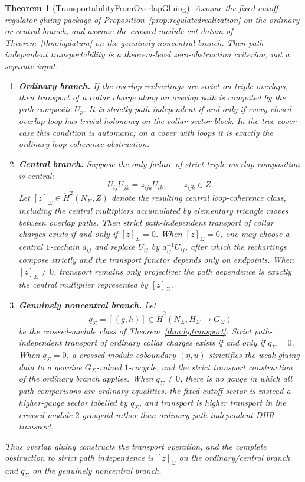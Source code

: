 \documentclass[11pt]{article}
\newtheorem{theorem}{Theorem}[section]
\begin{document}
\begin{theorem}[TransportabilityFromOverlapGluing]\label{thm:transport-from-gluing}
Assume the fixed-cutoff regulator gluing package of Proposition~\ref{prop:regulatedrealization}
on the ordinary or central branch, and assume the crossed-module cut datum of
Theorem~\ref{thm:hgdatum} on the genuinely noncentral branch. Then path-independent
transportability is a theorem-level zero-obstruction criterion, not a separate input.
\begin{enumerate}[label=\textup{(\roman*)},leftmargin=2em]
\item \textbf{Ordinary branch.} If the overlap rechartings are strict on triple overlaps, then
transport of a collar charge along an overlap path is computed by the path composite \(U_p\).
It is strictly path-independent if and only if every closed overlap loop has trivial holonomy on
the collar-sector block. In the tree-cover case this condition is automatic; on a cover with
loops it is exactly the ordinary loop-coherence obstruction.
\item \textbf{Central branch.} Suppose the only failure of strict triple-overlap composition is
central:
\[
U_{ij}U_{jk}=z_{ijk}U_{ik},\qquad z_{ijk}\in Z.
\]
Let \([z]_\Sigma\in \check H^2(N_\Sigma,Z)\) denote the resulting central loop-coherence class,
including the central multipliers accumulated by elementary triangle moves between overlap
paths. Then strict path-independent transport of collar charges exists if and only if
\([z]_\Sigma=0\). When \([z]_\Sigma=0\), one may choose a central \(1\)-cochain \(a_{ij}\) and
replace \(U_{ij}\) by \(a_{ij}^{-1}U_{ij}\), after which the rechartings compose strictly and the
transport functor depends only on endpoints. When \([z]_\Sigma\ne0\), transport remains only
projective: the path dependence is exactly the central multiplier represented by
\([z]_\Sigma\).
\item \textbf{Genuinely noncentral branch.} Let
\[
q_\Sigma=[(g,h)]\in \check H^2(N_\Sigma,H_\Sigma\to G_\Sigma)
\]
be the crossed-module class of Theorem~\ref{thm:hgtransport}. Strict path-independent transport
of ordinary collar charges exists if and only if \(q_\Sigma=0\). When \(q_\Sigma=0\), a
crossed-module coboundary \((\eta,u)\) strictifies the weak gluing data to a genuine
\(G_\Sigma\)-valued \(1\)-cocycle, and the strict transport construction of the ordinary branch
applies. When \(q_\Sigma\ne0\), there is no gauge in which all path comparisons are ordinary
equalities: the fixed-cutoff sector is instead a higher-gauge sector labelled by \(q_\Sigma\),
and transport is higher transport in the crossed-module \(2\)-groupoid rather than ordinary
path-independent DHR transport.
\end{enumerate}
Thus overlap gluing constructs the transport
operation, and the complete obstruction to strict path independence is \([z]_\Sigma\) on the
ordinary/central branch and \(q_\Sigma\) on the genuinely noncentral branch.
\end{theorem}
\end{document}
